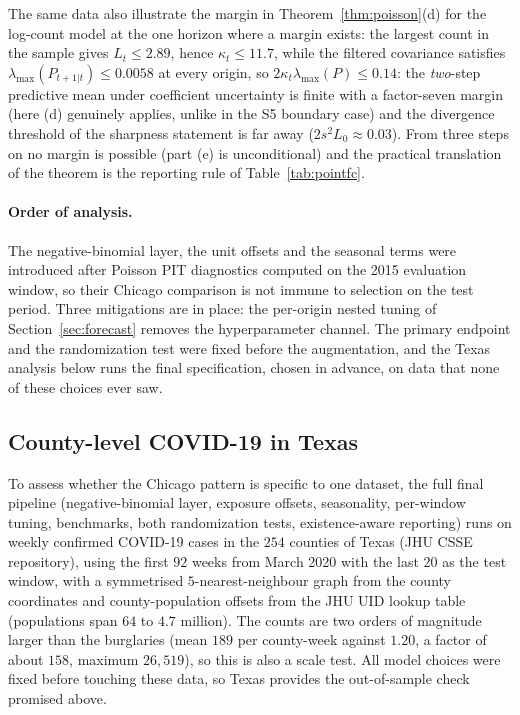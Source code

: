 \documentclass[12pt]{article}
\theoremstyle{plain}
\theoremstyle{definition}
\theoremstyle{remark}
\newcommand{\KappaChicago}{11.7}
\newcommand{\LamMaxPChicago}{0.0058}
\newcommand{\MarginChicago}{0.14}
\newcommand{\LtChicago}{2.89}
\begin{document}
The same data also illustrate the margin in Theorem~\ref{thm:poisson}(d) for the log-count model at the one horizon where a margin exists: the largest count in the sample gives $L_t\le\LtChicago$, hence $\kappa_t\le\KappaChicago$, while the filtered covariance satisfies $\lambda_{\max}(P_{t+1|t})\le\LamMaxPChicago$ at every origin, so $2\kappa_t\lambda_{\max}(P)\le\MarginChicago$: the \emph{two}-step predictive mean under coefficient uncertainty is finite with a factor-seven margin (here (d) genuinely applies, unlike in the S5 boundary case) and the divergence threshold of the sharpness statement is far away ($2s^2L_0\approx0.03$). From three steps on no margin is possible (part (e) is unconditional) and the practical translation of the theorem is the reporting rule of Table~\ref{tab:pointfc}.


\paragraph{Order of analysis.} The negative-binomial layer, the unit offsets and the seasonal terms were introduced after Poisson PIT diagnostics computed on the 2015 evaluation window, so their Chicago comparison is not immune to selection on the test period. Three mitigations are in place: the per-origin nested tuning of Section~\ref{sec:forecast} removes the hyperparameter channel. The primary endpoint and the randomization test were fixed before the augmentation, and the Texas analysis below runs the final specification, chosen in advance, on data that none of these choices ever saw.

\subsection{County-level COVID-19 in Texas}\label{sec:covid}

To assess whether the Chicago pattern is specific to one dataset, the full final pipeline (negative-binomial layer, exposure offsets, seasonality, per-window tuning, benchmarks, both randomization tests, existence-aware reporting) runs on weekly confirmed COVID-19 cases in the $254$ counties of Texas (JHU CSSE repository), using the first $92$ weeks from March 2020 with the last $20$ as the test window, with a symmetrised $5$-nearest-neighbour graph from the county coordinates and county-population offsets from the JHU UID lookup table (populations span $64$ to $4.7$ million). The counts are two orders of magnitude larger than the burglaries (mean $189$ per county-week against $1.20$, a factor of about $158$, maximum $26{,}519$), so this is also a scale test. All model choices were fixed before touching these data, so Texas provides the out-of-sample check promised above.
\end{document}
